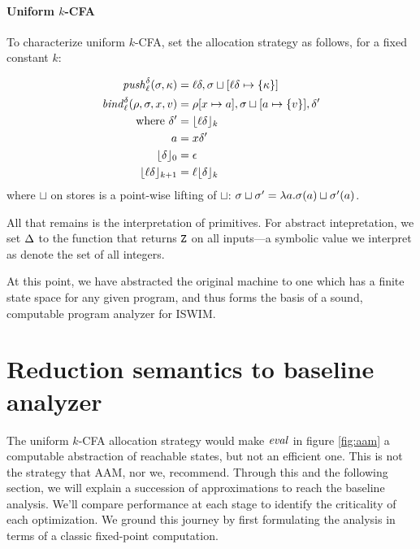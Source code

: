\documentclass[preprint,onecolumn,9pt]{sigplanconf} %
\begin{document}
\paragraph{Uniform \(k\)-CFA} To characterize uniform \(k\)-CFA, set the allocation
strategy as follows, for a fixed constant \(k\):

\begin{align*}
\mathit{push}_{\ell}^{\delta}(\sigma,\kappa) &=
  {\ell}{\delta},\sigma\sqcup[{\ell}{\delta}\mapsto\{\kappa\}] \\
\mathit{bind}^{\delta}_{\ell}(\rho,\sigma,x,v) &= \rho[x \mapsto a],
                                           \sigma\sqcup[a \mapsto
                                             \{ v\}],
                                           {\delta}' \\
\mbox{where } {\delta}' &= \lfloor{\ell}{\delta}\rfloor_k \\
              a &= x{\delta}' \\
              \lfloor {\delta} \rfloor_0 &= {\epsilon} \\
              \lfloor {\ell}{\delta} \rfloor_{k+1} &= {\ell}\lfloor {\delta}\rfloor_k
\end{align*}
where $\sqcup$ on stores is a point-wise lifting of $\sqcup$: $\sigma \sqcup \sigma' = \lambda a. \sigma(a) \sqcup \sigma'(a)$.

All that remains is the interpretation of primitives.  For abstract
intepretation, we set $\Delta$ to the function that returns
${\tt Z}$ on all inputs---a symbolic value we interpret as denote the
set of all integers.

At this point, we have abstracted the original machine to one which
has a finite state space for any given program, and thus forms the
basis of a sound, computable program analyzer for ISWIM.

\section{Reduction semantics to baseline analyzer}
\label{sec:baseline}

The uniform $k$-CFA allocation strategy would make $\mathit{eval}$ in figure
\ref{fig:aam} a computable abstraction of reachable states, but not an
efficient one. This is not the strategy that AAM, nor we, recommend. Through
this and the following section, we will explain a succession of approximations
to reach the baseline analysis.  We'll compare performance at each stage to
identify the criticality of each optimization. 
%
We ground this journey by first formulating the analysis in terms of a classic
fixed-point computation.
\end{document}
